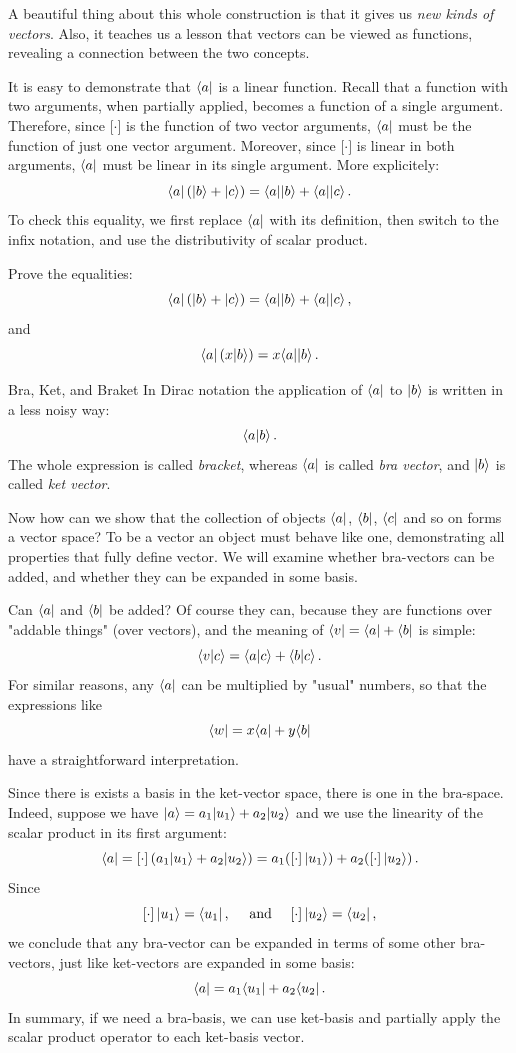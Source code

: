 A beautiful thing about this whole construction is that it gives us \emph{new kinds of vectors}. Also, it teaches us a lesson that vectors can be viewed as functions, revealing a connection between the two concepts.

It is easy to demonstrate that $\langle{a}|$ is a linear function. Recall that a function with two arguments, when partially applied, becomes a function of a single argument. Therefore, since $\lbrack\cdot\rbrack$ is the function of two vector arguments, $\langle{a}|$ must be the function of just one vector argument. Moreover, since $\lbrack\cdot\rbrack$ is linear in both arguments, $\langle{a}|$ must be linear in its single argument. More explicitely:
\[
\langle{a}|\,(|{b}\rangle+|{c}\rangle)=\langle{a}||{b}\rangle+\langle{a}||{c}\rangle\,.
\]
To check this equality, we first replace $\langle{a}|$ with its definition, then switch to the infix notation, and use the distributivity of scalar product.
\begin{exercise}
	Prove the equalities:
	\[
	\langle{a}|\,(|{b}\rangle+|{c}\rangle)=\langle{a}||{b}\rangle+\langle{a}||{c}\rangle\,,
	\]
	and
	\[
	\langle{a}|\,(x|{b}\rangle)=x\langle{a}||{b}\rangle\,.
	\]
\end{exercise}
\begin{mybio}{Bra, Ket, and Braket}
	In Dirac notation the application of $\langle{a}|$ to $|{b}\rangle$ is written in a less noisy way:
	\[
	\langle{a}|{b\rangle}\,.
	\]
	The whole expression is called \emph{bracket}, whereas $\langle{a}|$ is called \emph{bra vector}, and $|{b}\rangle$ is called \emph{ket vector}.
\end{mybio}

Now how can we show that the collection of objects $\langle{a}|$, $\langle{b}|$, $\langle{c}|$ and so on forms a vector space? To be a vector an object must behave like one, demonstrating all properties that fully define vector. We will examine whether bra-vectors can be added, and whether they can be expanded in some basis.

Can $\langle{a}|$ and $\langle{b}|$ be added? Of course they can, because they are functions over "addable things" (over vectors), and the meaning of $\langle{v}|=\langle{a}|+\langle{b}|$ is simple:
\[
\langle{v}|{c\rangle}=\langle{a}|{c\rangle}+\langle{b}|{c\rangle}\,.
\]
For similar reasons, any $\langle{a}|$ can be multiplied by "usual" numbers, so that the expressions like
\[
\langle{w}| = x\langle{a}|+y\langle{b}|
\]
have a straightforward interpretation.

Since there is exists a basis in the ket-vector space, there is one in the bra-space. Indeed, suppose we have $|{a}\rangle=a_1|{u_1}\rangle+a_2|{u_2}\rangle$ and we use the linearity of the scalar product in its first argument:
\[
\langle{a}| = \lbrack\cdot\rbrack\,(a_1|{u_1}\rangle+a_2|{u_2}\rangle)=a_1(\lbrack\cdot\rbrack\,|{u_1}\rangle)+
a_2(\lbrack\cdot\rbrack\,|{u_2}\rangle)\,.
\]
Since
\[
\lbrack\cdot\rbrack\,|{u_1}\rangle = \langle{u_1}|\,,\quad\textrm{ and }\quad\lbrack\cdot\rbrack\,|{u_2}\rangle = \langle{u_2}|\,,
\]
we conclude that any bra-vector can be expanded in terms of some other bra-vectors, just like ket-vectors are expanded in some basis:
\[
\langle{a}| = a_1\langle{u_1}|+a_2\langle{u_2}|\,.
\]
In summary, if we need a bra-basis, we can use ket-basis and partially apply the scalar product operator to each ket-basis vector. 

